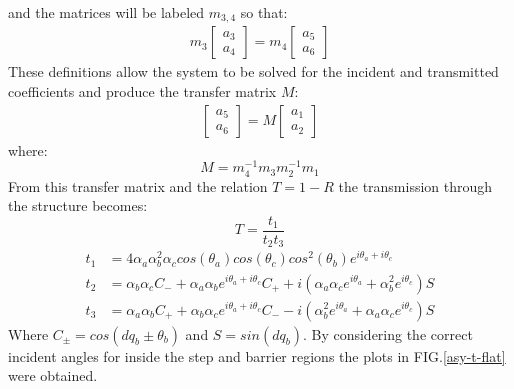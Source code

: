 \documentclass[prl,twocolumn,aps,superscriptaddress,floatfix,10pt]{revtex4}
\begin{document}
		and the matrices will be labeled $m_{3,4}$ so that:
		\begin{align}
			m_{3}\left[\begin{array}{ccc}
				a_{3}\\
				a_{4}
			\end{array}\right]
			=
			m_{4}\left[\begin{array}{ccc}
				a_{5}\\
				a_{6}
			\end{array}\right]
		\end{align}
		These definitions allow the system to be solved for the incident and transmitted coefficients and produce the transfer matrix $M$:
		\begin{align}
			\left[\begin{array}{ccc}
				a_{5}\\
				a_{6}
			\end{array}\right]=M
			\left[\begin{array}{ccc}
				a_{1}\\
				a_{2}
			\end{array}\right]
		\end{align}
where:
\begin{equation}
	M=m_{4}^{-1}m_{3}m_{2}^{-1}m_{1}
\end{equation}
From this transfer matrix and the relation $T=1-R$ the transmission through the structure becomes:
\begin{equation}
	T=\frac{t_{1}}{t_{2}t_{3}}
	\label{asy-t}
\end{equation}
\begin{align}
t_{1}&=4\alpha_{a}\alpha_{b}^{2}\alpha_{c}cos(\theta_{a})cos(\theta_{c})cos^{2}(\theta_{b})e^{i\theta_{a}+i\theta_{c}}
\\	t_{2}&=\alpha_{b}\alpha_{c}C_{-}+\alpha_{a}\alpha_{b}e^{i\theta_{a}+i\theta_{c}}C_{+}+i\left(\alpha_{a}\alpha_{c}e^{i\theta_{a}}+\alpha_{b}^{2}e^{i\theta_{c}}\right)S
\\
t_{3}&=\alpha_{a}\alpha_{b}C_{+}+\alpha_{b}\alpha_{c}e^{i\theta_{a}+i\theta_{c}}C_{-}-i\left(\alpha_{b}^{2}e^{i\theta_{a}}+\alpha_{a}\alpha_{c}e^{i\theta_{c}}\right)S
\end{align}
Where $C_{\pm}=cos(dq_{b}\pm\theta_{b})$ and $S=sin(dq_{b})$. By considering the correct incident angles for inside the step and barrier regions the plots in FIG.\ref{asy-t-flat} were obtained.
\end{document}
